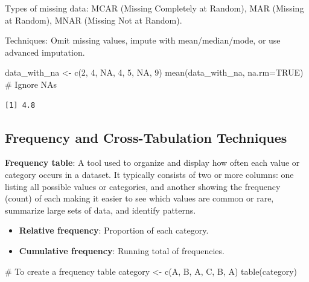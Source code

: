\documentclass[
  man,
  floatsintext,
  longtable,
  nolmodern,
  notxfonts,
  notimes,
  colorlinks=true,linkcolor=blue,citecolor=blue,urlcolor=blue]{apa7}
\newenvironment{Shaded}{\begin{snugshade}}{\end{snugshade}}
\newcommand{\AttributeTok}[1]{\textcolor[rgb]{0.40,0.45,0.13}{#1}}
\newcommand{\CommentTok}[1]{\textcolor[rgb]{0.37,0.37,0.37}{#1}}
\newcommand{\ConstantTok}[1]{\textcolor[rgb]{0.56,0.35,0.01}{#1}}
\newcommand{\DecValTok}[1]{\textcolor[rgb]{0.68,0.00,0.00}{#1}}
\newcommand{\FunctionTok}[1]{\textcolor[rgb]{0.28,0.35,0.67}{#1}}
\newcommand{\NormalTok}[1]{\textcolor[rgb]{0.00,0.23,0.31}{#1}}
\newcommand{\OtherTok}[1]{\textcolor[rgb]{0.00,0.23,0.31}{#1}}
\newcommand{\StringTok}[1]{\textcolor[rgb]{0.13,0.47,0.30}{#1}}
\providecommand{\tightlist}{%
  \setlength{\itemsep}{0pt}\setlength{\parskip}{0pt}}
\begin{document}
Types of missing data: MCAR (Missing Completely at Random), MAR (Missing
at Random), MNAR (Missing Not at Random).

Techniques: Omit missing values, impute with mean/median/mode, or use
advanced imputation.

\begin{Shaded}
\begin{Highlighting}[]
\NormalTok{data\_with\_na }\OtherTok{\textless{}{-}} \FunctionTok{c}\NormalTok{(}\DecValTok{2}\NormalTok{, }\DecValTok{4}\NormalTok{, }\ConstantTok{NA}\NormalTok{, }\DecValTok{4}\NormalTok{, }\DecValTok{5}\NormalTok{, }\ConstantTok{NA}\NormalTok{, }\DecValTok{9}\NormalTok{)}
\FunctionTok{mean}\NormalTok{(data\_with\_na, }\AttributeTok{na.rm=}\ConstantTok{TRUE}\NormalTok{) }\CommentTok{\# Ignore NAs}
\end{Highlighting}
\end{Shaded}

\begin{verbatim}
[1] 4.8
\end{verbatim}

\subsection{Frequency and Cross-Tabulation
Techniques}\label{frequency-and-cross-tabulation-techniques}

\textbf{Frequency table}: A tool used to organize and display how often
each value or category occurs in a dataset. It typically consists of two
or more columns: one listing all possible values or categories, and
another showing the frequency (count) of each making it easier to see
which values are common or rare, summarize large sets of data, and
identify patterns.

\begin{itemize}
\tightlist
\item
  \textbf{Relative frequency}: Proportion of each category.
\item
  \textbf{Cumulative frequency}: Running total of frequencies.
\end{itemize}

\begin{Shaded}
\begin{Highlighting}[]
\CommentTok{\# To create a frequency table }
\NormalTok{category }\OtherTok{\textless{}{-}} \FunctionTok{c}\NormalTok{(}\StringTok{\textquotesingle{}A\textquotesingle{}}\NormalTok{, }\StringTok{\textquotesingle{}B\textquotesingle{}}\NormalTok{, }\StringTok{\textquotesingle{}A\textquotesingle{}}\NormalTok{, }\StringTok{\textquotesingle{}C\textquotesingle{}}\NormalTok{, }\StringTok{\textquotesingle{}B\textquotesingle{}}\NormalTok{, }\StringTok{\textquotesingle{}A\textquotesingle{}}\NormalTok{)}
\FunctionTok{table}\NormalTok{(category)}
\end{Highlighting}
\end{Shaded}
\end{document}
